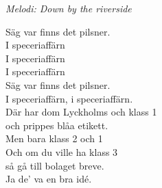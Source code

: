 {\footnotesize\textit{Melodi: Down by the riverside}}\par
\vspace{10pt}
Säg var finns det pilsner.\\
I speceriaffärn\\
I speceriaffärn\\
I speceriaffärn\\
Säg var finns det pilsner.\\
I speceriaffärn, i speceriaffärn.\\
Där har dom Lyckholms och klass 1\\
och prippes blåa etikett.\\
Men bara klass 2 och 1\\
Och om du ville ha klass 3\\
så gå till bolaget breve.\\
Ja de' va en bra idé.
